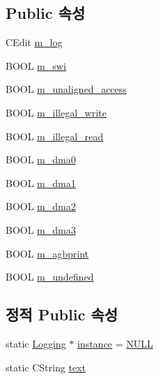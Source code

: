 \subsection*{Public 속성}
\begin{DoxyCompactItemize}
\item 
C\+Edit \mbox{\hyperlink{class_logging_ab1fbdc0eaf2afc3f7f493a3c9605511c}{m\+\_\+log}}
\item 
B\+O\+OL \mbox{\hyperlink{class_logging_abd4d213306cb311e8ae4ebdeebb02855}{m\+\_\+swi}}
\item 
B\+O\+OL \mbox{\hyperlink{class_logging_a7d30e53c3d12b78d9db8627a39fa9d4e}{m\+\_\+unaligned\+\_\+access}}
\item 
B\+O\+OL \mbox{\hyperlink{class_logging_a423cc3cbd5f9b710e696fdfb9ef4ec4b}{m\+\_\+illegal\+\_\+write}}
\item 
B\+O\+OL \mbox{\hyperlink{class_logging_a3b4a194ce51579e42841f4773510cb7d}{m\+\_\+illegal\+\_\+read}}
\item 
B\+O\+OL \mbox{\hyperlink{class_logging_ab0e3d418460cc5c8d699fd8c321463a2}{m\+\_\+dma0}}
\item 
B\+O\+OL \mbox{\hyperlink{class_logging_a7c8a00ceb6cc33b59daff89a3b509ab6}{m\+\_\+dma1}}
\item 
B\+O\+OL \mbox{\hyperlink{class_logging_a55074d40fb891df86bda48f59568b1e6}{m\+\_\+dma2}}
\item 
B\+O\+OL \mbox{\hyperlink{class_logging_aa540b301bc08f1302beb83ff574d89c4}{m\+\_\+dma3}}
\item 
B\+O\+OL \mbox{\hyperlink{class_logging_a1d79a280aa882918585c08f3e0c2b747}{m\+\_\+agbprint}}
\item 
B\+O\+OL \mbox{\hyperlink{class_logging_a622f9b082c10c8195c5faa7a8577d520}{m\+\_\+undefined}}
\end{DoxyCompactItemize}
\subsection*{정적 Public 속성}
\begin{DoxyCompactItemize}
\item 
static \mbox{\hyperlink{class_logging}{Logging}} $\ast$ \mbox{\hyperlink{class_logging_abbc7b283056098e51d9791175abbdc23}{instance}} = \mbox{\hyperlink{_system_8h_a070d2ce7b6bb7e5c05602aa8c308d0c4}{N\+U\+LL}}
\item 
static C\+String \mbox{\hyperlink{class_logging_a4a9482d0ffecc6b04232867690fd7b21}{text}}
\end{DoxyCompactItemize}
